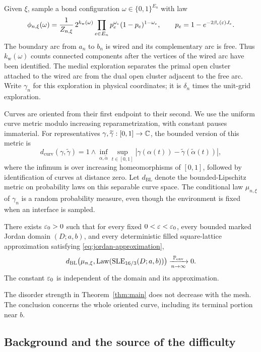 Given $\xi$, sample a bond configuration $\omega\in\{0,1\}^{E_n}$ with law
\begin{equation}\label{eq:main-fk-law}
 \phi_{n,\xi}(\omega)
 =\frac1{Z_{n,\xi}}\,
  2^{k_{\mathrm w}(\omega)}
  \prod_{e\in E_n}p_e^{\omega_e}(1-p_e)^{1-\omega_e},
 \qquad p_e=1-e^{-2\beta_c(\varepsilon)J_e}.
\end{equation}
The boundary arc from $a_n$ to $b_n$ is wired and its complementary arc is
free. Thus $k_{\mathrm w}(\omega)$ counts connected components after the
vertices of the wired arc have been identified. The medial exploration
separates the primal open cluster attached to the wired arc from the dual
open cluster adjacent to the free arc. Write $\gamma_n$ for this exploration
in physical coordinates; it is $\delta_n$ times the unit-grid exploration.

Curves are oriented from their first endpoint to their second. We use the
uniform curve metric modulo increasing reparametrization, with constant
pauses immaterial. For representatives $\gamma,\widetilde\gamma:[0,1]\to\mathbb C$,
the bounded version of this metric is
\[
 d_{\mathrm{curv}}(\gamma,\widetilde\gamma)
 =1\wedge\inf_{\alpha,\widetilde\alpha}
       \sup_{t\in[0,1]}
       |\gamma(\alpha(t))-\widetilde\gamma(\widetilde\alpha(t))|,
\]
where the infimum is over increasing homeomorphisms of $[0,1]$, followed
by identification of curves at distance zero. Let $d_{\mathrm{BL}}$ denote
the bounded-Lipschitz metric on probability laws on this separable curve
space. The conditional law $\mu_{n,\xi}$ of $\gamma_n$ is a random
probability measure, even though the environment is fixed when an interface
is sampled.

\begin{theorem}\label{thm:main}
There exists $\varepsilon_0>0$ such that for every fixed $0<\varepsilon<\varepsilon_0$, every
bounded marked Jordan domain $(D;a,b)$, and every deterministic filled
square-lattice approximation satisfying \eqref{eq:jordan-approximation},
\[
 d_{\mathrm{BL}}\bigl(\mu_{n,\xi},
       \operatorname{Law}(\mathrm{SLE}_{16/3}(D;a,b))\bigr)
   \xrightarrow[n\to\infty]{\mathbb P_{\mathrm{env}}}0.
\]
The constant $\varepsilon_0$ is independent of the domain and its approximation.
\end{theorem}

The disorder strength in Theorem~\ref{thm:main} does not decrease with the
mesh. The conclusion concerns the whole oriented curve, including its
terminal portion near $b$.

\subsection{Background and the source of the difficulty}

